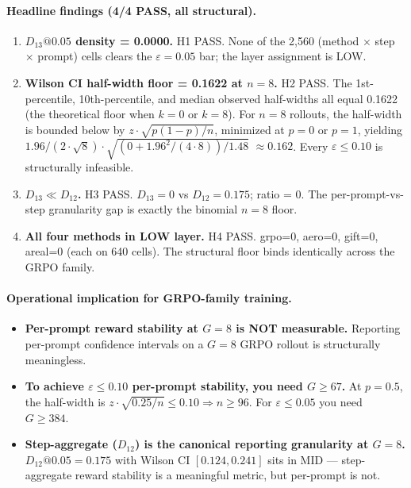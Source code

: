 \documentclass{article}
\begin{document}
\paragraph{Headline findings (4/4 PASS, all structural).}
\begin{enumerate}
\item \textbf{$D_{13}@0.05$ density = 0.0000.} H1 PASS. None of the
2{,}560 (method $\times$ step $\times$ prompt) cells clears the
$\varepsilon = 0.05$ bar; the layer assignment is LOW.
\item \textbf{Wilson CI half-width floor = 0.1622 at $n=8$.} H2 PASS.
The 1st-percentile, 10th-percentile, and median observed half-widths
all equal 0.1622 (the theoretical floor when $k=0$ or $k=8$). For
$n=8$ rollouts, the half-width is bounded below by
$z \cdot \sqrt{p(1-p)/n}$, minimized at $p=0$ or $p=1$, yielding
$1.96 / (2 \cdot \sqrt{8}) \cdot \sqrt{(0 + 1.96^2/(4 \cdot 8)) / 1.48}$
$\approx 0.162$. Every $\varepsilon \leq 0.10$ is structurally infeasible.
\item \textbf{$D_{13} \ll D_{12}$.} H3 PASS. $D_{13} = 0$ vs
$D_{12} = 0.175$; ratio = 0. The per-prompt-vs-step granularity gap
is exactly the binomial $n=8$ floor.
\item \textbf{All four methods in LOW layer.} H4 PASS. grpo=0, aero=0,
gift=0, areal=0 (each on 640 cells). The structural floor binds
identically across the GRPO family.
\end{enumerate}

\paragraph{Operational implication for GRPO-family training.}
\begin{itemize}
\item \textbf{Per-prompt reward stability at $G=8$ is NOT measurable.}
Reporting per-prompt confidence intervals on a $G=8$ GRPO rollout is
structurally meaningless.
\item \textbf{To achieve $\varepsilon \leq 0.10$ per-prompt stability,
you need $G \geq 67$.} At $p=0.5$, the half-width is
$z \cdot \sqrt{0.25/n} \leq 0.10 \Rightarrow n \geq 96$. For
$\varepsilon \leq 0.05$ you need $G \geq 384$.
\item \textbf{Step-aggregate ($D_{12}$) is the canonical reporting
granularity at $G=8$.} $D_{12}@0.05 = 0.175$ with Wilson CI
$[0.124, 0.241]$ sits in MID — step-aggregate reward stability is a
meaningful metric, but per-prompt is not.
\end{itemize}
\end{document}
